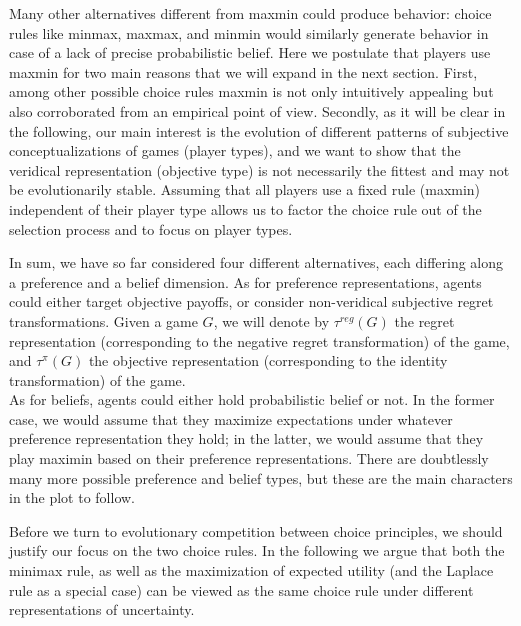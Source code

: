 \documentclass[fleqn,reqno,11pt]{article}
\begin{document}
Many other alternatives different from maxmin could produce behavior: choice rules like minmax, maxmax, and minmin would similarly generate behavior in case of a lack of precise probabilistic belief. Here we postulate that players use maxmin for two main reasons that we will expand in the next section. First, among other possible choice rules maxmin is not only intuitively appealing but also corroborated from an empirical point of view. Secondly, as it will be clear in the following, our main interest is the evolution of different patterns of subjective conceptualizations of games (player types), and we want to show that the veridical representation (objective type) is not necessarily the fittest and may not be evolutionarily stable. Assuming that all players use a fixed rule (maxmin) independent of their player type allows us to factor the choice rule out of the selection process and to focus on player types.



\bigskip
\bigskip


\bigskip
\bigskip




In sum, we have so far considered four different alternatives, each differing along a
preference and a belief dimension. As for preference representations, agents could either
target objective payoffs, or consider non-veridical subjective regret transformations. Given a game $G$, we will denote by $ \tau^{reg}(G)$ the regret representation (corresponding to the negative regret transformation) of the game, and $\tau^{\pi}(G)$ the objective representation (corresponding to the identity transformation) of the game. \\
As for
beliefs, agents could either hold probabilistic belief or not. In the former case, we would
assume that they maximize expectations under whatever preference representation they hold; in
the latter, we would assume that they play maximin based on their preference
representations. There are doubtlessly many more possible preference and belief types, but
these are the main characters in the plot to follow. 

Before we turn to evolutionary competition between choice principles, we should justify our
focus on the two choice rules. In the following we argue that both the minimax rule, as well as the maximization of expected utility 
(and the Laplace rule as a special case) can be viewed as the same choice rule under different representations of
uncertainty. 
\end{document}
